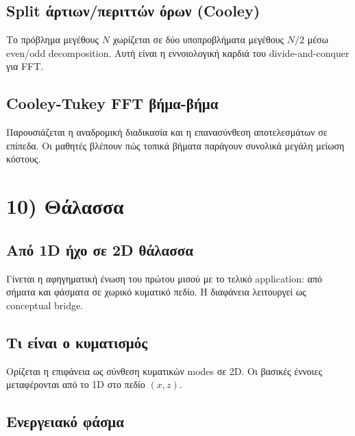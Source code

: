 \documentclass[
  a4paper,
  11pt,
]{article}
\begin{document}
\subsection{Split άρτιων/περιττών όρων
(Cooley)}\label{split-ux3acux3c1ux3c4ux3b9ux3c9ux3bdux3c0ux3b5ux3c1ux3b9ux3c4ux3c4ux3ceux3bd-ux3ccux3c1ux3c9ux3bd-cooley}

Το πρόβλημα μεγέθους \(N\) χωρίζεται σε δύο υποπροβλήματα μεγέθους
\(N/2\) μέσω even/odd decomposition. Αυτή είναι η εννοιολογική καρδιά
του divide-and-conquer για FFT.

\subsection{Cooley-Tukey FFT
βήμα-βήμα}\label{cooley-tukey-fft-ux3b2ux3aeux3bcux3b1-ux3b2ux3aeux3bcux3b1}

Παρουσιάζεται η αναδρομική διαδικασία και η επανασύνθεση αποτελεσμάτων
σε επίπεδα. Οι μαθητές βλέπουν πώς τοπικά βήματα παράγουν συνολικά
μεγάλη μείωση κόστους.

\section{10) Θάλασσα}\label{ux3b8ux3acux3bbux3b1ux3c3ux3c3ux3b1}

\subsection{Από 1D ήχο σε 2D
θάλασσα}\label{ux3b1ux3c0ux3cc-1d-ux3aeux3c7ux3bf-ux3c3ux3b5-2d-ux3b8ux3acux3bbux3b1ux3c3ux3c3ux3b1}

Γίνεται η αφηγηματική ένωση του πρώτου μισού με το τελικό application:
από σήματα και φάσματα σε χωρικό κυματικό πεδίο. Η διαφάνεια λειτουργεί
ως conceptual bridge.

\subsection{Τι είναι ο
κυματισμός}\label{ux3c4ux3b9-ux3b5ux3afux3bdux3b1ux3b9-ux3bf-ux3baux3c5ux3bcux3b1ux3c4ux3b9ux3c3ux3bcux3ccux3c2}

Ορίζεται η επιφάνεια ως σύνθεση κυματικών modes σε 2D. Οι βασικές
έννοιες μεταφέρονται από το 1D στο πεδίο \((x,z)\).

\subsection{Ενεργειακό
φάσμα}\label{ux3b5ux3bdux3b5ux3c1ux3b3ux3b5ux3b9ux3b1ux3baux3cc-ux3c6ux3acux3c3ux3bcux3b1}
\end{document}
